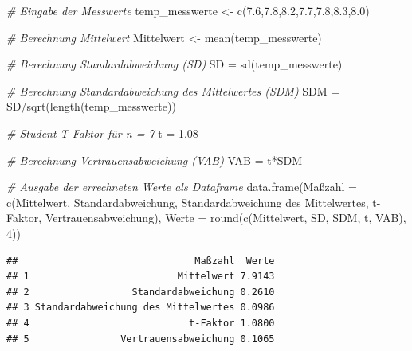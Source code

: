 \documentclass[
]{article}
\newenvironment{Shaded}{\begin{snugshade}}{\end{snugshade}}
\newcommand{\AttributeTok}[1]{\textcolor[rgb]{0.77,0.63,0.00}{#1}}
\newcommand{\CommentTok}[1]{\textcolor[rgb]{0.56,0.35,0.01}{\textit{#1}}}
\newcommand{\DecValTok}[1]{\textcolor[rgb]{0.00,0.00,0.81}{#1}}
\newcommand{\FloatTok}[1]{\textcolor[rgb]{0.00,0.00,0.81}{#1}}
\newcommand{\FunctionTok}[1]{\textcolor[rgb]{0.00,0.00,0.00}{#1}}
\newcommand{\NormalTok}[1]{#1}
\newcommand{\OtherTok}[1]{\textcolor[rgb]{0.56,0.35,0.01}{#1}}
\newcommand{\SpecialCharTok}[1]{\textcolor[rgb]{0.00,0.00,0.00}{#1}}
\newcommand{\StringTok}[1]{\textcolor[rgb]{0.31,0.60,0.02}{#1}}
\begin{document}
\begin{Shaded}
\begin{Highlighting}[]
\CommentTok{\# Eingabe der Messwerte}
\NormalTok{temp\_messwerte }\OtherTok{\textless{}{-}} \FunctionTok{c}\NormalTok{(}\FloatTok{7.6}\NormalTok{,}\FloatTok{7.8}\NormalTok{,}\FloatTok{8.2}\NormalTok{,}\FloatTok{7.7}\NormalTok{,}\FloatTok{7.8}\NormalTok{,}\FloatTok{8.3}\NormalTok{,}\FloatTok{8.0}\NormalTok{)}

\CommentTok{\# Berechnung Mittelwert}
\NormalTok{Mittelwert }\OtherTok{\textless{}{-}} \FunctionTok{mean}\NormalTok{(temp\_messwerte)}

\CommentTok{\# Berechnung Standardabweichung (SD)}
\NormalTok{SD }\OtherTok{=} \FunctionTok{sd}\NormalTok{(temp\_messwerte)}

\CommentTok{\# Berechnung Standardabweichung des Mittelwertes (SDM)}
\NormalTok{SDM }\OtherTok{=}\NormalTok{ SD}\SpecialCharTok{/}\FunctionTok{sqrt}\NormalTok{(}\FunctionTok{length}\NormalTok{(temp\_messwerte))}

\CommentTok{\# Student T{-}Faktor für n = 7}
\NormalTok{t }\OtherTok{=} \FloatTok{1.08}

\CommentTok{\# Berechnung Vertrauensabweichung (VAB)}
\NormalTok{VAB }\OtherTok{=}\NormalTok{ t}\SpecialCharTok{*}\NormalTok{SDM}

\CommentTok{\# Ausgabe der errechneten Werte als Dataframe}
\FunctionTok{data.frame}\NormalTok{(Maßzahl }\OtherTok{=} \FunctionTok{c}\NormalTok{(}\StringTok{\textquotesingle{}Mittelwert\textquotesingle{}}\NormalTok{, }\StringTok{\textquotesingle{}Standardabweichung\textquotesingle{}}\NormalTok{,}
                       \StringTok{\textquotesingle{}Standardabweichung des Mittelwertes\textquotesingle{}}\NormalTok{,}
                       \StringTok{\textquotesingle{}t{-}Faktor\textquotesingle{}}\NormalTok{, }\StringTok{\textquotesingle{}Vertrauensabweichung\textquotesingle{}}\NormalTok{),}
           \AttributeTok{Werte =} \FunctionTok{round}\NormalTok{(}\FunctionTok{c}\NormalTok{(Mittelwert, SD, SDM, t, VAB), }\DecValTok{4}\NormalTok{))}
\end{Highlighting}
\end{Shaded}

\begin{verbatim}
##                               Maßzahl  Werte
## 1                          Mittelwert 7.9143
## 2                  Standardabweichung 0.2610
## 3 Standardabweichung des Mittelwertes 0.0986
## 4                            t-Faktor 1.0800
## 5                Vertrauensabweichung 0.1065
\end{verbatim}
\end{document}
